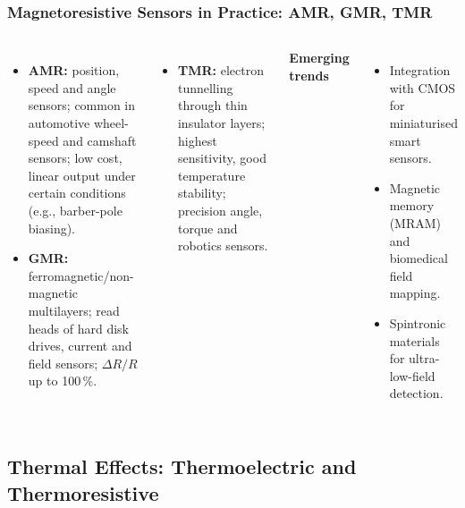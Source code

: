 \begin{frame}
	\frametitle{Magnetoresistive Sensors in Practice: AMR, GMR, TMR}
	\begin{columns}[T,onlytextwidth]
		\begin{itemize}
			\item \textbf{AMR:} position, speed and angle sensors; common in automotive wheel-speed and camshaft sensors; low cost, linear output under certain conditions (e.g., barber-pole biasing).
			\item \textbf{GMR:} ferromagnetic/non-magnetic multilayers; read heads of hard disk drives, current and field sensors; $\Delta R/R$ up to 100\,\%.
		\end{itemize}
		\begin{itemize}
			\item \textbf{TMR:} electron tunnelling through thin insulator layers; highest sensitivity, good temperature stability; precision angle, torque and robotics sensors.
		\end{itemize}
		\textbf{Emerging trends}
		\begin{itemize}
			\item Integration with CMOS for miniaturised smart sensors.
			\item Magnetic memory (MRAM) and biomedical field mapping.
			\item Spintronic materials for ultra-low-field detection.
		\end{itemize}
	\end{columns}
\end{frame}

\subsection{Thermal Effects: Thermoelectric and Thermoresistive}

